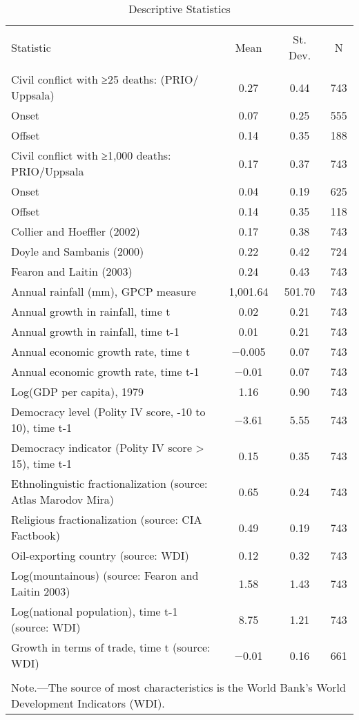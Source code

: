 

\begin{table}[!htbp] \centering 
  \caption{Descriptive Statistics} 
  \label{} 
\begin{tabular}{@{\extracolsep{5pt}}lccc} 
\\[-1.8ex]\hline 
\hline \\[-1.8ex] 
Statistic & \multicolumn{1}{c}{Mean} & \multicolumn{1}{c}{St. Dev.} & \multicolumn{1}{c}{N} \\ 
\hline \\[-1.8ex] 
Civil conflict with ≥25 deaths: (PRIO/
Uppsala) & 0.27 & 0.44 & 743 \\ 
Onset & 0.07 & 0.25 & 555 \\ 
Offset & 0.14 & 0.35 & 188 \\ 
Civil conflict with ≥1,000 deaths:
PRIO/Uppsala & 0.17 & 0.37 & 743 \\ 
Onset & 0.04 & 0.19 & 625 \\ 
Offset & 0.14 & 0.35 & 118 \\ 
Collier and Hoeffler (2002) & 0.17 & 0.38 & 743 \\ 
Doyle and Sambanis (2000) & 0.22 & 0.42 & 724 \\ 
Fearon and Laitin (2003) & 0.24 & 0.43 & 743 \\ 
Annual rainfall (mm), GPCP measure & 1,001.64 & 501.70 & 743 \\ 
Annual growth in rainfall, time t & 0.02 & 0.21 & 743 \\ 
Annual growth in rainfall, time t-1 & 0.01 & 0.21 & 743 \\ 
Annual economic growth rate, time t & $-$0.005 & 0.07 & 743 \\ 
Annual economic growth rate, time t-1 & $-$0.01 & 0.07 & 743 \\ 
Log(GDP per capita), 1979 & 1.16 & 0.90 & 743 \\ 
Democracy level (Polity IV score, -10 to 10), time t-1 & $-$3.61 & 5.55 & 743 \\ 
Democracy indicator (Polity IV score > 15),
time t-1 & 0.15 & 0.35 & 743 \\ 
Ethnolinguistic fractionalization (source:
Atlas Marodov Mira) & 0.65 & 0.24 & 743 \\ 
Religious fractionalization (source: CIA
Factbook) & 0.49 & 0.19 & 743 \\ 
Oil-exporting country (source: WDI) & 0.12 & 0.32 & 743 \\ 
Log(mountainous) (source: Fearon and
Laitin 2003) & 1.58 & 1.43 & 743 \\ 
Log(national population), time t-1
(source: WDI) & 8.75 & 1.21 & 743 \\ 
Growth in terms of trade, time t (source:
WDI) & $-$0.01 & 0.16 & 661 \\ 
\hline \\[-1.8ex] 
\multicolumn{4}{l}{Note.—The source of most characteristics is the World Bank’s World Development Indicators (WDI).} \\ 
\end{tabular} 
\end{table} 
